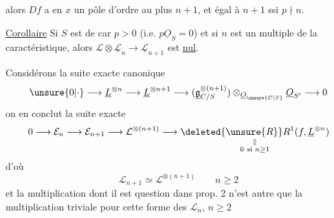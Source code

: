  alors  $Df$ a en $x$ un pôle d'ordre au plus $n+1$, et égal à $n+1$ ssi $p\nmid n$.



\uline{Corollaire} Si $S$ est de car $p>0$ (i.e. $p\underline O_S=0$) et si $n$ est un multiple de la caractéristique, alors $\mathcal L\otimes\underline{\mathcal L}_n\longrightarrow\underline{\mathcal L}_{n+1}$ est \uline{nul}.

 Considérons la suite exacte canonique
\[
\unsure{0|\cdot}\longrightarrow\underline L^{\otimes n}\longrightarrow\underline L^{\otimes n+1}\longrightarrow
(\underline{\mathfrak g}_{C/S}^{\otimes(n+1)})\otimes_{\underline O_{\unsure{C|S}}}\underline O_{S'}\longrightarrow0
\]
on en conclut la suite exacte
\[
0\longrightarrow\mathcal E_n\longrightarrow\mathcal E_{n+1}\longrightarrow\mathcal L^{\otimes(n+1)}\longrightarrow
\underset{\substack{\Vert\\0\ \text{si }n\geq1}}{\deleted{\unsure{R}}R^{1}(f,\underline L^{\otimes n})}
\]
d'où
\[
\boxed{\mathcal L_{n+1}\simeq\mathcal L^{\otimes(n+1)}\qquad n\geq2}
\]
et la multiplication dont il est question dans prop. 2 n'est autre que la multiplication triviale pour cette forme des $\mathcal L_n$, $n\geq2$
